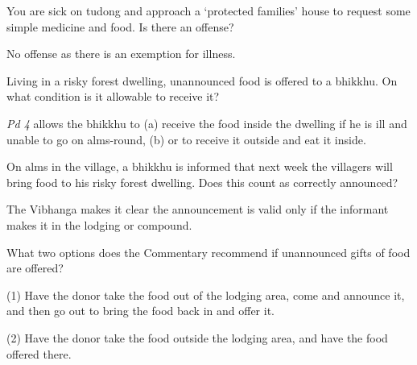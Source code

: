 You are sick on tudong and approach a ‘protected families’ house to request some
simple medicine and food. Is there an offense?

\bigskip

\begin{solution}
  No offense as there is an exemption for illness.
\end{solution}


Living in a risky forest dwelling, unannounced food is offered to a bhikkhu.
On what condition is it allowable to receive it?

\begin{solution}
  \emph{Pd 4} allows the bhikkhu to
  (a) receive the food inside the dwelling if he is ill and unable to go on alms-round,
  (b) or to receive it outside and eat it inside.
\end{solution}

\bigskip

On alms in the village, a bhikkhu is informed that next week the villagers will
bring food to his risky forest dwelling. Does this count as correctly announced?

\begin{solution}
  The Vibhanga makes it clear the announcement is valid only if the informant
  makes it in the lodging or compound.
\end{solution}

\bigskip

What two options does the Commentary recommend if unannounced gifts of food are offered?

\begin{solution}
  (1) Have the donor take the food out of the lodging area, come and announce it,
  and then go out to bring the food back in and offer it.
 
  (2) Have the donor take the food outside the lodging area, and have the food
  offered there.
\end{solution}
